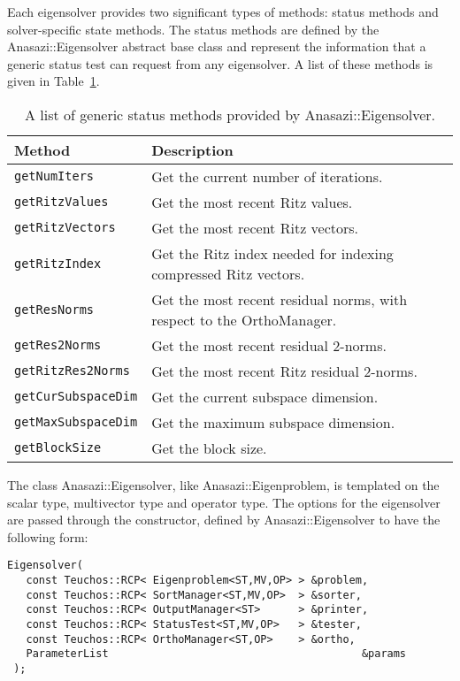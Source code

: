 Each eigensolver provides two significant types of methods: status methods and
solver-specific state methods. The status methods are defined by the Anasazi::Eigensolver
abstract base class and represent the information that a generic status test can request
from any eigensolver. A list of these methods is given in
Table~\ref{tab:anasazi:genstatusmethods}.

\begin{table}[htp]
\begin{center}
\begin{tabular}{| p{4cm} p{10cm} |}
\hline
Method & Description \\
\hline
{\tt getNumIters}       & Get the current number of iterations. \\
{\tt getRitzValues}     & Get the most recent Ritz values. \\
{\tt getRitzVectors}    & Get the most recent Ritz vectors. \\
{\tt getRitzIndex}      & Get the Ritz index needed for indexing compressed Ritz vectors. \\
{\tt getResNorms}       & Get the most recent residual norms, with respect to the OrthoManager. \\
{\tt getRes2Norms}      & Get the most recent residual 2-norms. \\
{\tt getRitzRes2Norms}  & Get the most recent Ritz residual 2-norms. \\
{\tt getCurSubspaceDim} & Get the current subspace dimension. \\
{\tt getMaxSubspaceDim} & Get the maximum subspace dimension. \\
{\tt getBlockSize}      & Get the block size. \\
\hline
\end{tabular}
\caption{A list of generic status methods provided by Anasazi::Eigensolver.}
\label{tab:anasazi:genstatusmethods}
\end{center}
\end{table}

The class Anasazi::Eigensolver, like Anasazi::Eigenproblem, is templated on the scalar
type, multivector type and operator type. The options for the eigensolver are passed
through the constructor, defined by Anasazi::Eigensolver to have the following form:
\begin{verbatim}
Eigensolver( 
   const Teuchos::RCP< Eigenproblem<ST,MV,OP> > &problem, 
   const Teuchos::RCP< SortManager<ST,MV,OP>  > &sorter,
   const Teuchos::RCP< OutputManager<ST>      > &printer,
   const Teuchos::RCP< StatusTest<ST,MV,OP>   > &tester,
   const Teuchos::RCP< OrthoManager<ST,OP>    > &ortho,
   ParameterList                                        &params  
 );
\end{verbatim}

